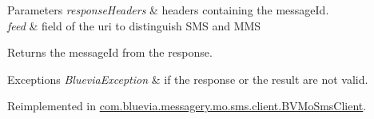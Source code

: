 \begin{DoxyParams}{Parameters}
{\em responseHeaders} & headers containing the messageId. \\
\hline
{\em feed} & field of the uri to distinguish SMS and MMS \\
\hline
\end{DoxyParams}
\begin{DoxyReturn}{Returns}
the messageId from the response. 
\end{DoxyReturn}

\begin{DoxyExceptions}{Exceptions}
{\em BlueviaException} & if the response or the result are not valid. \\
\hline
\end{DoxyExceptions}


Reimplemented in \hyperlink{classcom_1_1bluevia_1_1messagery_1_1mo_1_1sms_1_1client_1_1BVMoSmsClient_a0d299eda99452f1ddf51e235cf7d9bce}{com.bluevia.messagery.mo.sms.client.BVMoSmsClient}.

